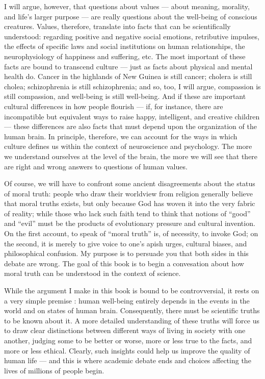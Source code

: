 \documentclass[a4paper,12pt]{extbook}
\begin{document}
I will argue, however, that questions about values --- about meaning, morality, and life's larger purpose --- are really questions about the well-being of conscious creatures. 
Values, therefore, translate into facts that can be scientifically understood: regarding positive and negative social emotions, retributive impulses, the effects of specific laws and social institutions on human relationships, the neurophysiology of happiness and suffering, etc. 
The most important of these facts are bound to transcend culture --- just as facts about physical and mental health do. 
Cancer in the highlands of New Guinea is still cancer;
cholera is still cholea;
schizophrenia is still schizophrenia;
and so, too, I will argue, compassion is still compassion, and well-being is still well-being. 
And if these are important cultural differences in how people flourish --- if, for instance, there are incompatible but equivalent ways to raise happy, intelligent, and creative children --- these differences are also facts that must depend upon the organization of the human brain. 
In principle, therefore, we can account for the ways in which culture defines us within the context of neuroscience and psychology. 
The more we understand ourselves at the level of the brain, the more we will see that there are right and wrong answers to questions of human values. 

Of course, we will have to confront some ancient disagreements about the status of moral truth:
people who draw their worldview from religion generally believe that moral truths exists, but only because God has woven it into the very fabric of reality;
while those who lack such faith tend to think that notions of ``good'' and ``evil'' must be the products of evolutionary pressure and cultural invention. 
On the first account, to speak of ``moral truth'' is, of necessity, to invoke God;
on the second, it is merely to give voice to one's apish urges, cultural biases, and philosophical confusion. 
My purpose is to persuade you that both sides in this debate are wrong. 
The goal of this book is to begin a convesation about how moral truth can be understood in the context of science. 

While the argument I make in this book is bound to be controvversial, it rests on a very simple premise :
human well-being entirely depends in the events in the world and on states of human brain. 
Consequently, there must be scientific truths to be known about it. 
A more detailed understanding of these truths will force us to draw clear distinctions between different ways of living in society with one another, judging some to be better or worse, more or less true to the facts, and more or less ethical. 
Clearly, such insights could help us improve the quality of human life --- and this is where academic debate ends and choices affecting the lives of millions of people begin. 
\end{document}
